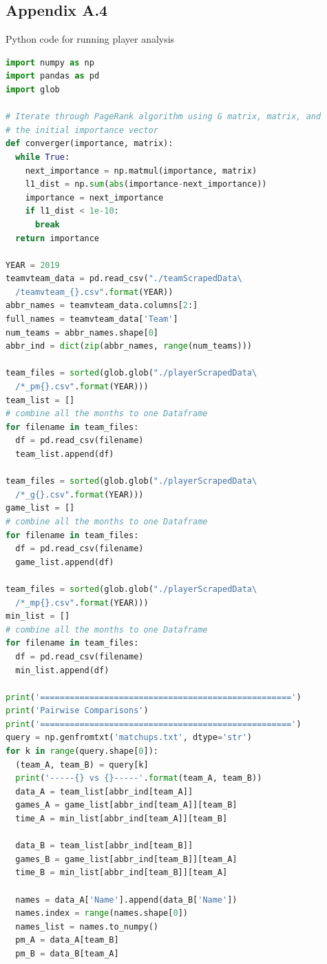 \documentclass[12pt]{article}%
\begin{document}
\subsection{Appendix A.4}
Python code for running player analysis
\begin{lstlisting}[language=Python]
import numpy as np
import pandas as pd
import glob

# Iterate through PageRank algorithm using G matrix, matrix, and 
# the initial importance vector
def converger(importance, matrix):
  while True:
    next_importance = np.matmul(importance, matrix)
    l1_dist = np.sum(abs(importance-next_importance))
    importance = next_importance
    if l1_dist < 1e-10:
      break
  return importance

YEAR = 2019
teamvteam_data = pd.read_csv("./teamScrapedData\
  /teamvteam_{}.csv".format(YEAR))
abbr_names = teamvteam_data.columns[2:]
full_names = teamvteam_data['Team']
num_teams = abbr_names.shape[0]
abbr_ind = dict(zip(abbr_names, range(num_teams)))

team_files = sorted(glob.glob("./playerScrapedData\
  /*_pm{}.csv".format(YEAR)))
team_list = []
# combine all the months to one Dataframe
for filename in team_files:
  df = pd.read_csv(filename)
  team_list.append(df)

team_files = sorted(glob.glob("./playerScrapedData\
  /*_g{}.csv".format(YEAR)))
game_list = []
# combine all the months to one Dataframe
for filename in team_files:
  df = pd.read_csv(filename)
  game_list.append(df)

team_files = sorted(glob.glob("./playerScrapedData\
  /*_mp{}.csv".format(YEAR)))
min_list = []
# combine all the months to one Dataframe
for filename in team_files:
  df = pd.read_csv(filename)
  min_list.append(df)

print('===================================================')
print('Pairwise Comparisons')
print('===================================================')
query = np.genfromtxt('matchups.txt', dtype='str')
for k in range(query.shape[0]):
  (team_A, team_B) = query[k]
  print('-----{} vs {}-----'.format(team_A, team_B))
  data_A = team_list[abbr_ind[team_A]]
  games_A = game_list[abbr_ind[team_A]][team_B]
  time_A = min_list[abbr_ind[team_A]][team_B]

  data_B = team_list[abbr_ind[team_B]]
  games_B = game_list[abbr_ind[team_B]][team_A]
  time_B = min_list[abbr_ind[team_B]][team_A]

  names = data_A['Name'].append(data_B['Name'])
  names.index = range(names.shape[0])
  names_list = names.to_numpy()
  pm_A = data_A[team_B]
  pm_B = data_B[team_A]


\end{lstlisting}
\end{document}
